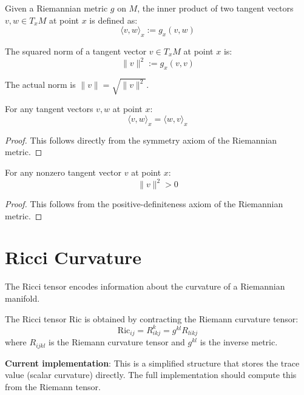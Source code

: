 \begin{definition}
\label{def:inner_product}
\leanok
{}
Given a Riemannian metric $g$ on $M$, the inner product of two tangent vectors
$v, w \in T_xM$ at point $x$ is defined as:
\[ \langle v, w \rangle_x := g_x(v, w) \]
\end{definition}

\begin{definition}
\label{def:norm_sq}
\leanok
{}
The squared norm of a tangent vector $v \in T_xM$ at point $x$ is:
\[ \|v\|^2 := g_x(v, v) \]

The actual norm is $\|v\| = \sqrt{\|v\|^2}$.
\end{definition}

\begin{lemma}
\label{lem:inner_product_symm}
\leanok
{}
For any tangent vectors $v, w$ at point $x$:
\[ \langle v, w \rangle_x = \langle w, v \rangle_x \]
\end{lemma}

\begin{proof}
\leanok
{}
This follows directly from the symmetry axiom of the Riemannian metric.
\end{proof}

\begin{lemma}
\label{lem:norm_sq_pos}
\leanok
{}
For any nonzero tangent vector $v$ at point $x$:
\[ \|v\|^2 > 0 \]
\end{lemma}

\begin{proof}
\leanok
{}
This follows from the positive-definiteness axiom of the Riemannian metric.
\end{proof}

\chapter{Ricci Curvature}
\label{chap:ricci}

The Ricci tensor encodes information about the curvature of a Riemannian manifold.

\begin{definition}
\label{def:ricci_tensor}
\leanok
{}
The Ricci tensor $\mathrm{Ric}$ is obtained by contracting the Riemann curvature tensor:
\[ \mathrm{Ric}_{ij} = R^k_{ikj} = g^{kl} R_{likj} \]
where $R_{ijkl}$ is the Riemann curvature tensor and $g^{kl}$ is the inverse metric.

\textbf{Current implementation}: This is a simplified structure that stores the trace value
(scalar curvature) directly. The full implementation should compute this from the Riemann tensor.
\end{definition}

